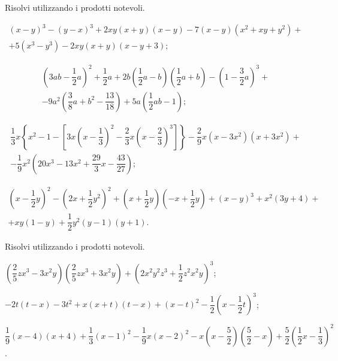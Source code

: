 \begin{esercizio}[\Ast]
 \label{ese:12.40}
Risolvi utilizzando i prodotti notevoli.
\begin{enumeratea}
 \item
 \begin{multline*}
 (x-y)^{3}-(y-x)^{3}+2{xy}(x+y)(x-y)-7(x-y)\left(x^{2}+{xy}+y^{2}\right)+\\
 +5\left(x^{3}-y^{3}\right)-2{xy}(x+y)(x-y+3);
 \end{multline*}
 \item
 \begin{multline*}
 \left(3ab-\dfrac{1}{2}a\right)^{2}+\dfrac{1}{2}a+2b\left(\dfrac{1}{2}a-b\right)\left(\dfrac{1}{2}a+b\right)-\left(1-\dfrac{3}{2}a\right)^{3}+\\
 -9a^{2}\left(\dfrac{3}{8}a+b^{2}-\dfrac{13}{18}\right)+5a\left(\dfrac{1}{2}{ab}-1\right);
 \end{multline*}
 \item
 \begin{multline*}
 \dfrac{1}{3}x\left\{x^{2}-1-\left[3x\left(x-\dfrac{1}{3}\right)^{2}-\dfrac{2}{3}x\left(x-\dfrac{2}{3}\right)^{3}\right]\right\}-\dfrac{2}{9}x\left(x-3x^{2}\right)\left(x+3x^{2}\right)+\\
 -\dfrac{1}{9}x^{2}\left(20x^{3}-13x^{2}+\dfrac{29}{3}x-\dfrac{43}{27}\right);
 \end{multline*}
 \item
 \begin{multline*}
 \left(x-\dfrac{1}{2}y\right)^{2}-\left(2x+\dfrac{1}{2}y^{2}\right)^{2}+\left(x+\dfrac{1}{2}y\right)\left(-x+\dfrac{1}{2}y\right)+(x-y)^{3}+x^{2}(3y+4)+\\
 +xy(1-y)+\dfrac{1}{2}y^{2}(y-1)(y+1).
 \end{multline*}
\end{enumeratea}
\end{esercizio}

\begin{esercizio}
 \label{ese:12.41}
Risolvi utilizzando i prodotti notevoli.
 \begin{enumeratea}
 \item $\left(\dfrac{2}{5}zx^{3}-3x^{2}y\right)\left(\dfrac{2}{5}zx^{3}+3x^{2}y\right)+\left(2x^{2}y^{2}z^{3}+\dfrac{1}{2}z^{2}x^{2}y\right)^{3}$;
 \item $-2t(t-x)-3t^{2}+x(x+t)(t-x)+(x-t)^{2}-\dfrac{1}{2}\left(x-\dfrac{1}{2}t\right)^{3}$;
 \item $\dfrac{1}{9}(x-4)(x+4)+\dfrac{1}{3}(x-1)^{2}-\dfrac{1}{9}x(x-2)^{2}-x\left(x-\dfrac{5}{2}\right)\left(\dfrac{5}{2}-x\right)+\dfrac{5}{2}\left(\dfrac{1}{2}x-\dfrac{1}{3}\right)^{2}$.
 \end{enumeratea}
\end{esercizio}

